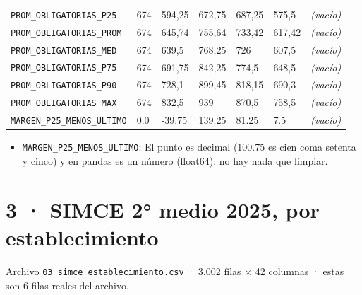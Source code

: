 \documentclass[10pt]{article}
\begin{document}
\begin{xltabular}{\linewidth}{@{}p{4.3cm} Y Y Y Y Y Y @{}}
\texttt{PROM\_\allowbreak{}OBLIGATORIAS\_\allowbreak{}P25} & 674 & 594,25 & 672,75 & 687,25 & 575,5 & \textit{\color{gris}(vacío)} \\
\texttt{PROM\_\allowbreak{}OBLIGATORIAS\_\allowbreak{}PROM} & 674 & 645,74 & 755,64 & 733,42 & 617,42 & \textit{\color{gris}(vacío)} \\
\texttt{PROM\_\allowbreak{}OBLIGATORIAS\_\allowbreak{}MED} & 674 & 639,5 & 768,25 & 726 & 607,5 & \textit{\color{gris}(vacío)} \\
\texttt{PROM\_\allowbreak{}OBLIGATORIAS\_\allowbreak{}P75} & 674 & 691,75 & 842,25 & 774,5 & 648,5 & \textit{\color{gris}(vacío)} \\
\texttt{PROM\_\allowbreak{}OBLIGATORIAS\_\allowbreak{}P90} & 674 & 728,1 & 899,45 & 818,15 & 690,3 & \textit{\color{gris}(vacío)} \\
\texttt{PROM\_\allowbreak{}OBLIGATORIAS\_\allowbreak{}MAX} & 674 & 832,5 & 939 & 870,5 & 758,5 & \textit{\color{gris}(vacío)} \\
\texttt{MARGEN\_\allowbreak{}P25\_\allowbreak{}MENOS\_\allowbreak{}ULTIMO} & 0.0 & -{}39.75 & 139.25 & 81.25 & 7.5 & \textit{\color{gris}(vacío)} \\
\end{xltabular}
\normalsize

\begin{alertabox}
\begin{itemize}[leftmargin=1.4em,itemsep=2pt,topsep=2pt]
\item \texttt{MARGEN\_\allowbreak{}P25\_\allowbreak{}MENOS\_\allowbreak{}ULTIMO}: El punto es decimal (100.75 es cien coma setenta y cinco) y en pandas es un número (float64): no hay nada que limpiar.
\end{itemize}
\end{alertabox}

\clearpage
\hypertarget{base3}{}
\section{3 · SIMCE 2° medio 2025, por establecimiento}
\small Archivo \texttt{03\_simce\_establecimiento.csv} · 3.002 filas × 42 columnas · estas son 6 filas reales del archivo.\normalsize
\end{document}
